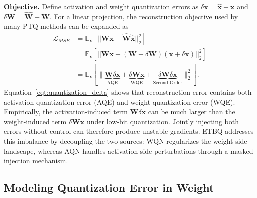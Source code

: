 \documentclass{article}
\begin{document}
\textbf{Objective.} Define activation and weight quantization errors as $\delta \boldsymbol{x} = \hat{\boldsymbol{x}} - \boldsymbol{x}$ and $\delta \boldsymbol{W} = \hat{\boldsymbol{W}} - \boldsymbol{W}$. For a linear projection, the reconstruction objective used by many PTQ methods can be expanded as
\begin{equation}
\label{eqt:quantization_delta}
    \begin{aligned}
    \mathcal{L}_{MSE} &= \mathbb{E}_{\boldsymbol{x}} \left[ ||\boldsymbol{W}\boldsymbol{x} - \hat{\boldsymbol{W}}\hat{\boldsymbol{x}}||^2_2 \right] \\
    &= \mathbb{E}_{\boldsymbol{x}} \left[ ||\boldsymbol{W}\boldsymbol{x} - \left(\boldsymbol{W} + \delta \boldsymbol{W} \right)\left(\boldsymbol{x} + \delta \boldsymbol{x} \right)||^2_2 \right]\\
    & =  \mathbb{E}_{\boldsymbol{x}}\left[ \|\underbrace{\boldsymbol{W}\delta \boldsymbol{x}}_{\text{AQE}} + \underbrace{\delta \boldsymbol{W} \boldsymbol{x}}_{\text{WQE}} + \underbrace{\delta \boldsymbol{W} \delta \boldsymbol{x}}_{\text{Second-Order}}\|^2_2\right].
    \end{aligned}
\end{equation}
Equation~\eqref{eqt:quantization_delta} shows that reconstruction error contains both activation quantization error (AQE) and weight quantization error (WQE). Empirically, the activation-induced term $\boldsymbol{W}\delta \boldsymbol{x}$ can be much larger than the weight-induced term $\delta \boldsymbol{W}\boldsymbol{x}$ under low-bit quantization. Jointly injecting both errors without control can therefore produce unstable gradients. ETBQ addresses this imbalance by decoupling the two sources: WQN regularizes the weight-side landscape, whereas AQN handles activation-side perturbations through a masked injection mechanism.

\subsection{Modeling Quantization Error in Weight}
\label{sec:wqn}
\end{document}
